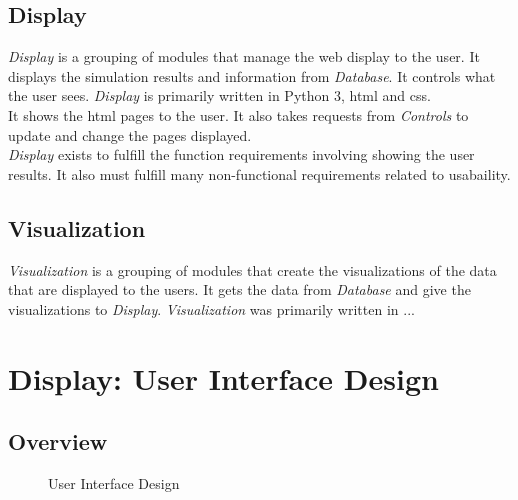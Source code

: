 \documentclass[12pt]{article}
\begin{document}
\subsection{Display}
\textit{Display} is a grouping of modules that manage the web display to the user. It displays the simulation results and information from \textit{Database}. It controls what the user sees. \textit{Display} is primarily written in Python 3, html and css. \\
It shows the html pages to the user. It also takes requests from \textit{Controls} to update and change the pages displayed. \\
\textit{Display} exists to fulfill the function requirements involving showing the user results. It also must fulfill many non-functional requirements related to usabaility. \\
\subsection{Visualization}
\textit{Visualization} is a grouping of modules that create
the visualizations of the data that are displayed to the users. 
It gets the data from \textit{Database} and give the visualizations to \textit{Display}. \textit{Visualization} was primarily written in ...

\section{Display: User Interface Design}
\subsection{Overview}


\begin{figure}[H]
	\centering
	\caption{User Interface Design}
\end{figure}
\end{document}
